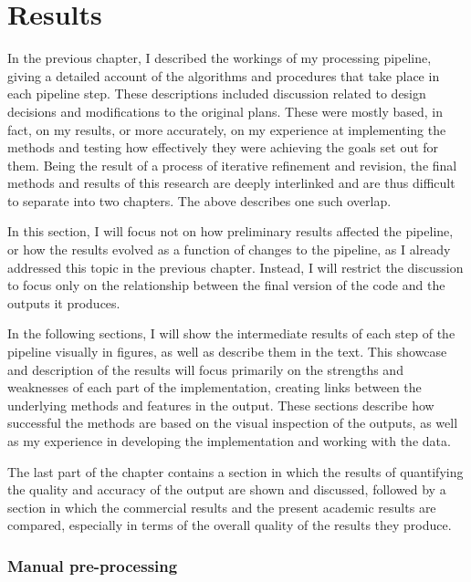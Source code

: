 
\chapter{Results}
\label{chap:r}

In the previous chapter, I described the workings of my processing pipeline, giving a detailed account of the algorithms and procedures that take place in each pipeline step. These descriptions included discussion related to design decisions and modifications to the original plans. These were mostly based, in fact, on my results, or more accurately, on my experience at implementing the methods and testing how effectively they were achieving the goals set out for them. Being the result of a process of iterative refinement and revision, the final methods and results of this research are deeply interlinked and are thus difficult to separate into two chapters. The above describes one such overlap.

In this section, I will focus not on how preliminary results affected the pipeline, or how the results evolved as a function of changes to the pipeline, as I already addressed this topic in the previous chapter. Instead, I will restrict the discussion to focus only on the relationship between the final version of the code and the outputs it produces.

In the following sections, I will show the intermediate results of each step of the pipeline visually in figures, as well as describe them in the text. This showcase and description of the results will focus primarily on the strengths and weaknesses of each part of the implementation, creating links between the underlying methods and features in the output. These sections describe how successful the methods are based on the visual inspection of the outputs, as well as my experience in developing the implementation and working with the data.

The last part of the chapter contains a section in which the results of quantifying the quality and accuracy of the output are shown and discussed, followed by a section in which the commercial results and the present academic results are compared, especially in terms of the overall quality of the results they produce.

\subsection{Manual pre-processing}
\label{sub:manualpreprocessing}


